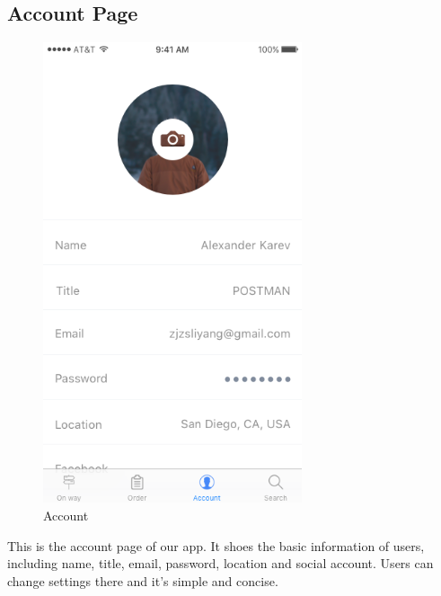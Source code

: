 \documentclass[12pt]{scrreprt}
\begin{document}
\subsection{Account Page}
\begin{figure}[H]
  \centering\includegraphics[width=3in]{DocumentRes/Account.png}
  \caption{Account}
\end{figure}
This is the account page of our app. It shoes the basic information of users, including name, title, email, password, location and social account. Users can change settings there and it's simple and concise.
\end{document}

